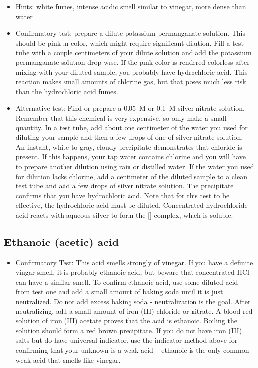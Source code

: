 \begin{itemize}

\item{Hints: white fumes, 
intense acidic smell similar to vinegar, 
more dense than water}

\item{Confirmatory test: 
prepare a dilute potassium permanganate solution. 
This should be pink in color, 
which might require significant dilution. 
Fill a test tube with a couple centimeters of your dilute solution 
and add the potassium permanganate solution drop wise. 
If the pink color is rendered colorless 
after mixing with your diluted sample, 
you probably have hydrochloric acid. 
This reaction makes small amounts of chlorine gas, 
but that poses much less risk than the hydrochloric acid fumes.}

\item{Alternative test: 
Find or prepare a 0.05~M or 0.1~M silver nitrate solution. 
Remember that this chemical is very expensive, 
so only make a small quantity. 
In a test tube, 
add about one centimeter of the water you used 
for diluting your sample 
and then a few drops of one of silver nitrate solution. 
An instant, 
white to gray, 
cloudy precipitate demonstrates that chloride is present. 
If this happens, 
your tap water contains chlorine 
and you will have to prepare another dilution 
using rain or distilled water. 
If the water you used for dilution lacks chlorine, 
add a centimeter of the diluted sample 
to a clean test tube and add a few drops of silver nitrate solution. 
The precipitate confirms that you have hydrochloric acid. 
Note that for this test to be effective, 
the hydrochloric acid must be diluted. 
Concentrated hydrochloride acid reacts with aqueous silver 
to form the []-complex, 
which is soluble.}

\end{itemize}

\subsection{Ethanoic (acetic) acid}

\begin{itemize}

\item{Confirmatory Test: This acid smells strongly of vinegar. 
If you have a definite vingar smell, 
it is probably ethanoic acid, 
but beware that concentrated HCl can have a similar smell. 
To confirm ethanoic acid, 
use some diluted acid from test one 
and add a small amount of baking soda until it is just neutralized. 
Do not add excess baking soda - neutralization is the goal. 
After neutralizing, 
add a small amount of iron (III) chloride or nitrate. 
A blood red solution of iron (III) acetate 
proves that the acid is ethanoic. 
Boiling the solution should form a red brown precipitate. 
If you do not have iron (III) salts but do have universal indicator, 
use the indicator method above 
for confirming that your unknown is a weak acid -- 
ethanoic is the only common weak acid that smells like vinegar.} 
\end{itemize}

